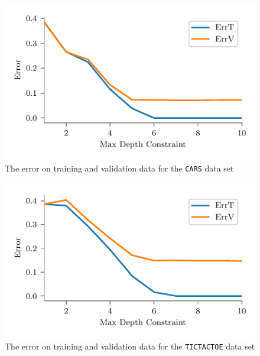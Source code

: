 \documentclass[screen, authorversion, nonacm, sigconf]{acmart}
\begin{document}
\begin{figure}[H]
  \centering
  \includegraphics[width=\columnwidth]{figures/chart_errt_errv_car_ours.pdf}
  \caption{The error on training and validation data for the \texttt{CARS} data set}
  \label{fig:carerrterrv}
\end{figure}

\begin{figure}[H]
  \centering
  \includegraphics[width=\columnwidth]{figures/chart_errt_errv_tictactoe_ours.pdf}
  \caption{The error on training and validation data for the \texttt{TICTACTOE} data set}
  \label{fig:ttterrterrv}
\end{figure}
\end{document}
